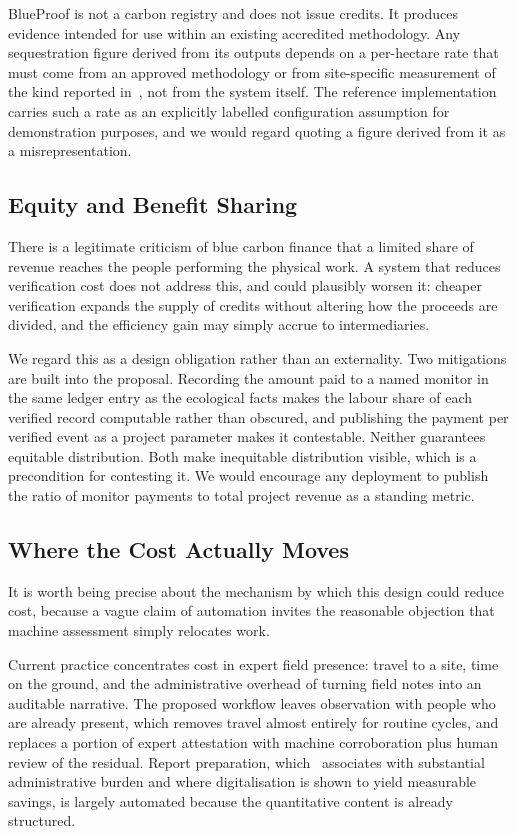 \documentclass[10pt,twocolumn,a4paper]{article}
\begin{document}
BlueProof is not a carbon registry and does not issue credits. It produces
evidence intended for use within an existing accredited methodology. Any
sequestration figure derived from its outputs depends on a per-hectare rate that
must come from an approved methodology or from site-specific measurement of the
kind reported in~\cite{kairo2021}, not from the system itself. The reference
implementation carries such a rate as an explicitly labelled configuration
assumption for demonstration purposes, and we would regard quoting a figure
derived from it as a misrepresentation.

\subsection{Equity and Benefit Sharing}
\label{sec:equity}

There is a legitimate criticism of blue carbon finance that a limited share of
revenue reaches the people performing the physical work. A system that reduces
verification cost does not address this, and could plausibly worsen it: cheaper
verification expands the supply of credits without altering how the proceeds are
divided, and the efficiency gain may simply accrue to intermediaries.

We regard this as a design obligation rather than an externality. Two mitigations
are built into the proposal. Recording the amount paid to a named monitor in the
same ledger entry as the ecological facts makes the labour share of each verified
record computable rather than obscured, and publishing the payment per verified
event as a project parameter makes it contestable. Neither guarantees equitable
distribution. Both make inequitable distribution visible, which is a
precondition for contesting it. We would encourage any deployment to publish the
ratio of monitor payments to total project revenue as a standing metric.

\subsection{Where the Cost Actually Moves}

It is worth being precise about the mechanism by which this design could reduce
cost, because a vague claim of automation invites the reasonable objection
that machine assessment simply relocates work.

Current practice concentrates cost in expert field presence: travel to a site,
time on the ground, and the administrative overhead of turning field notes into
an auditable narrative. The proposed workflow leaves observation with people who
are already present, which removes travel almost entirely for routine cycles,
and replaces a portion of expert attestation with machine corroboration plus
human review of the residual. Report preparation, which~\cite{vanderheyden2026}
associates with substantial administrative burden and where digitalisation is
shown to yield measurable savings, is largely automated because the quantitative
content is already structured.
\end{document}
